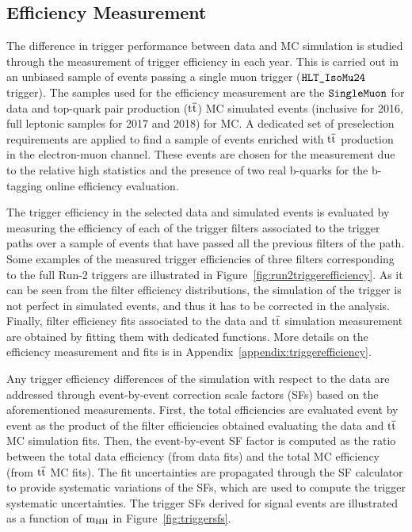\subsection{Efficiency Measurement}
The difference in trigger performance between data and MC simulation is studied through the measurement of trigger efficiency in each year. This is carried out in an unbiased sample of events passing a single muon trigger ($\verb|HLT_IsoMu24|$ trigger). The samples used for the efficiency measurement are the $\verb|SingleMuon|$ for data and top-quark pair production ($\mathrm{t\overline{t}}$) MC simulated events (inclusive for 2016, full leptonic samples for 2017 and 2018) for MC. A dedicated set of preselection requirements are applied to find a sample of events enriched with $\mathrm{t\overline{t}}$ production in the electron-muon channel. These events are chosen for the measurement due to the relative high statistics and the presence of two real b-quarks for the b-tagging online efficiency evaluation. 

The trigger efficiency in the selected data and simulated events is evaluated by measuring the efficiency of each of the trigger filters associated to the trigger paths over a sample of events that have passed all the previous filters of the path. Some examples of the measured trigger efficiencies of three filters corresponding to the full Run-2 triggers are illustrated in Figure~\ref{fig:run2triggerefficiency}. As it can be seen from the filter efficiency distributions, the simulation of the trigger is not perfect in simulated events, and thus it has to be corrected in the analysis. Finally, filter efficiency fits associated to the data and $\mathrm{t\overline{t}}$ simulation measurement are obtained by fitting them with dedicated functions. More details on the efficiency measurement and fits is in Appendix~\ref{appendix:triggerefficiency}. 

Any trigger efficiency differences of the simulation with respect to the data are addressed through event-by-event correction scale factors (SFs) based on the aforementioned measurements. First, the total efficiencies are evaluated event by event as the product of the filter efficiencies obtained evaluating the data and $\mathrm{t\overline{t}}$ MC simulation fits. Then, the event-by-event SF factor is computed as the ratio between the total data efficiency (from data fits) and the total MC efficiency (from $\mathrm{t\overline{t}}$ MC fits). The fit uncertainties are propagated through the SF calculator to provide systematic variations of the SFs, which are used to compute the trigger systematic uncertainties. The trigger SFs derived for signal events are illustrated as a function of $\mathrm{m_{HH}}$ in Figure~\ref{fig:triggersfs}.

